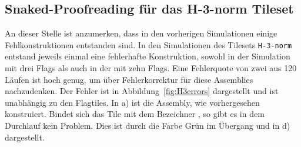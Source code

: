 \subsection{Snaked-Proofreading für das H-3-norm Tileset}
\label{sec:snaked_proof_tiles}

An dieser Stelle ist anzumerken, dass in den vorherigen Simulationen einige Fehlkonstruktionen entstanden sind. In den Simulationen des Tilesets \texttt{H-3-norm} entstand jeweils einmal eine fehlerhafte Konstruktion, sowohl in der Simulation mit drei Flags als auch in der mit zehn Flags. Eine Fehlerquote von zwei aus 120 Läufen ist hoch genug, um über Fehlerkorrektur für diese Assemblies nachzudenken. Der Fehler ist in Abbildung~\ref{fig:H3errors} dargestellt und ist unabhängig zu den Flagtiles. In a) ist die Assembly, wie vorhergesehen konstruiert. Bindet sich das Tile mit dem Bezeichner \grqq, so gibt es in dem Durchlauf kein Problem. Dies ist durch die Farbe Grün im Übergang und in d) dargestellt. 


